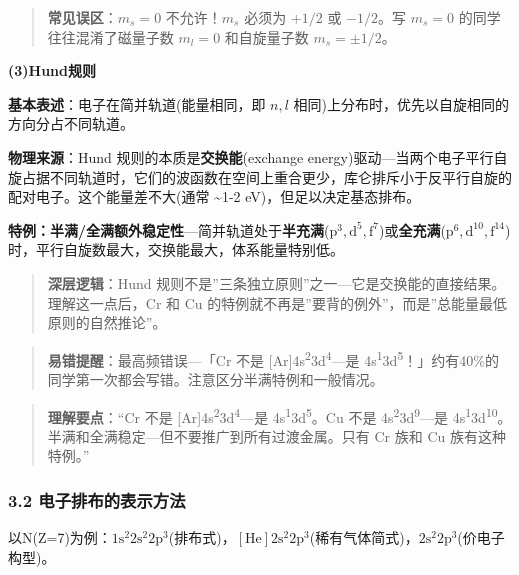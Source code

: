 \documentclass[a4paper,11pt]{ctexart}
\newcommand{\箭}{\ensuremath{\rightarrow}}
\newcommand{\左箭}{\ensuremath{\leftarrow}}
\newcommand{\上箭}{\ensuremath{\uparrow}}
\newcommand{\下箭}{\ensuremath{\downarrow}}
\newcommand{\衡}{\ensuremath{\rightleftharpoons}}
\newcommand{\双箭}{\ensuremath{\leftrightarrow}}
\newcommand{\约等于}{\ensuremath{\approx}}
\newcommand{\小于等于}{\ensuremath{\leq}}
\newcommand{\大于等于}{\ensuremath{\geq}}
\newcommand{\不等于}{\ensuremath{\neq}}
\newcommand{\西格马}{\ensuremath{\sigma}}
\newcommand{\派}{\ensuremath{\pi}}
\begin{document}
\begin{quote}
\textbf{常见误区}：\(m_s=0\) 不允许！\(m_s\) 必须为 \(+1/2\) 或 \(-1/2\)。写 \(m_s=0\) 的同学往往混淆了磁量子数 \(m_l=0\) 和自旋量子数 \(m_s=±1/2\)。
\end{quote}

\textbf{(3)Hund规则}

\textbf{基本表述}：电子在简并轨道(能量相同，即 \(n,l\) 相同)上分布时，优先以自旋相同的方向分占不同轨道。

\textbf{物理来源}：Hund 规则的本质是\textbf{交换能}(exchange energy)驱动---当两个电子平行自旋占据不同轨道时，它们的波函数在空间上重合更少，库仑排斥小于反平行自旋的配对电子。这个能量差不大(通常 \textasciitilde1-2 eV)，但足以决定基态排布。

\textbf{特例：半满/全满额外稳定性}---简并轨道处于\textbf{半充满}(\(\mathrm{p^3, d^5, f^7}\))或\textbf{全充满}(\(\mathrm{p^6, d^{10}, f^{14}}\))时，平行自旋数最大，交换能最大，体系能量特别低。

\begin{quote}
\textbf{深层逻辑}：Hund 规则不是''三条独立原则''之一---它是交换能的直接结果。理解这一点后，Cr 和 Cu 的特例就不再是''要背的例外''，而是''总能量最低原则的自然推论''。
\end{quote}

\begin{quote}
\textbf{易错提醒}：最高频错误---「Cr 不是 {[}Ar{]}4s\textsuperscript{2}3d\textsuperscript{4}---是 4s\textsuperscript{1}3d\textsuperscript{5}！」约有40\%的同学第一次都会写错。注意区分半满特例和一般情况。
\end{quote}

\begin{quote}
\textbf{理解要点}：``Cr 不是 {[}Ar{]}4s\textsuperscript{2}3d\textsuperscript{4}---是 4s\textsuperscript{1}3d\textsuperscript{5}。Cu 不是 4s\textsuperscript{2}3d\textsuperscript{9}---是 4s\textsuperscript{1}3d\textsuperscript{10}。半满和全满稳定---但不要推广到所有过渡金属。只有 Cr 族和 Cu 族有这种特例。''
\end{quote}

\subsubsection{3.2 电子排布的表示方法}\label{ux7535ux5b50ux6392ux5e03ux7684ux8868ux793aux65b9ux6cd5}

以N(Z=7)为例：\(1\mathrm{s}^2 2\mathrm{s}^2 2\mathrm{p}^3\)(排布式)，\([\mathrm{He}] 2\mathrm{s}^2 2\mathrm{p}^3\)(稀有气体简式)，\(2\mathrm{s}^2 2\mathrm{p}^3\)(价电子构型)。
\end{document}
